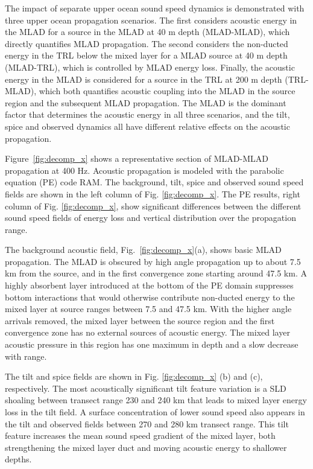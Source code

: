 \documentclass[preprint,NumberedRefs]{JASA}
\begin{document}
The impact of separate upper ocean sound speed dynamics is demonstrated with three upper ocean propagation scenarios. The first considers acoustic energy in the MLAD for a source in the MLAD at 40 m depth (MLAD-MLAD), which directly quantifies MLAD propagation. The second considers the non-ducted energy in the TRL below the mixed layer for a MLAD source at 40 m depth (MLAD-TRL), which is controlled by MLAD energy loss. Finally, the acoustic energy in the MLAD is considered for a source in the TRL at 200 m depth (TRL-MLAD), which both quantifies acoustic coupling into the MLAD in the source region and the subsequent MLAD propagation. The MLAD is the dominant factor that determines the acoustic energy in all three scenarios, and the tilt, spice and observed dynamics all have different relative effects on the acoustic propagation.

Figure~\ref{fig:decomp_x} shows a representative section of MLAD-MLAD propagation at 400 Hz. Acoustic propagation is modeled with the parabolic equation (PE) code RAM\citep{collins93}. The background, tilt, spice and observed sound speed fields are shown in the left column of Fig. \ref{fig:decomp_x}. The PE results, right column  of Fig. \ref{fig:decomp_x}, show significant differences between the different sound speed fields of energy loss and vertical distribution over the propagation range.

The background acoustic field, Fig.~\ref{fig:decomp_x}(a), shows basic MLAD propagation. The MLAD is obscured by high angle propagation up to about 7.5 km from the source, and in the first convergence zone starting around 47.5 km. A highly absorbent layer introduced at the bottom of the PE domain suppresses bottom interactions that would otherwise contribute non-ducted energy to the mixed layer at source ranges between 7.5 and 47.5 km. With the higher angle arrivals removed, the mixed layer between the source region and the first convergence zone has no external sources of acoustic energy. The mixed layer acoustic pressure in this region has one maximum in depth and a slow decrease with range.

The tilt and spice fields are shown in Fig. \ref{fig:decomp_x} (b) and (c), respectively. The most acoustically significant tilt feature variation is a SLD shoaling between transect range 230 and 240 km that leads to mixed layer energy loss in the tilt field. A surface concentration of lower sound speed also appears in the tilt and observed fields between 270 and 280 km transect range. This tilt feature increases the mean sound speed gradient of the mixed layer, both strengthening the mixed layer duct and moving acoustic energy to shallower depths.
\end{document}
